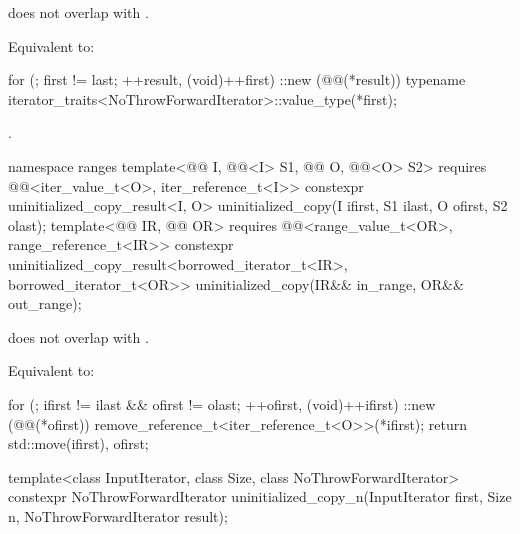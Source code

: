 \begin{itemdescr}
\pnum
\expects
{} does not overlap with .

\pnum
\effects
Equivalent to:
\begin{codeblock}
for (; first != last; ++result, (void)++first)
  ::new (@@(*result))
    typename iterator_traits<NoThrowForwardIterator>::value_type(*first);
\end{codeblock}

\pnum
\returns
{}.
\end{itemdescr}

%
\begin{itemdecl}
namespace ranges {
  template<@@ I, @@<I> S1,
           @@ O, @@<O> S2>
    requires @@<iter_value_t<O>, iter_reference_t<I>>
    constexpr uninitialized_copy_result<I, O>
      uninitialized_copy(I ifirst, S1 ilast, O ofirst, S2 olast);
  template<@@ IR, @@ OR>
    requires @@<range_value_t<OR>, range_reference_t<IR>>
    constexpr uninitialized_copy_result<borrowed_iterator_t<IR>, borrowed_iterator_t<OR>>
      uninitialized_copy(IR&& in_range, OR&& out_range);
}
\end{itemdecl}

\begin{itemdescr}
\pnum
\expects
{} does not overlap with .

\pnum
\effects
Equivalent to:
\begin{codeblock}
for (; ifirst != ilast && ofirst != olast; ++ofirst, (void)++ifirst)
  ::new (@@(*ofirst)) remove_reference_t<iter_reference_t<O>>(*ifirst);
return {std::move(ifirst), ofirst};
\end{codeblock}
\end{itemdescr}

%
\begin{itemdecl}
template<class InputIterator, class Size, class NoThrowForwardIterator>
  constexpr NoThrowForwardIterator uninitialized_copy_n(InputIterator first, Size n,
                                                        NoThrowForwardIterator result);
\end{itemdecl}

